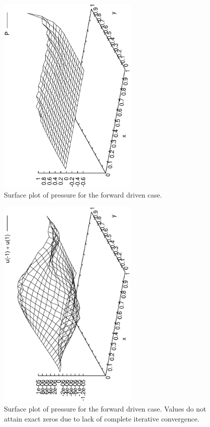 \documentclass[a4paper, 10pt]{article}
\begin{document}
\begin{enumerate}[I]
    \begin{figure}
      \centering
      \includegraphics[width=0.6\textwidth, angle = -90]{../plot/basic/pressure/P.eps}
      \caption{Surface plot of pressure for the forward driven case.}
      \label{splotP}
    \end{figure}
    
    \begin{figure}
      \centering
      \includegraphics[width=0.6\textwidth, angle = -90]{../plot/basic/velocity/UU.eps}
      \caption{Surface plot of pressure for the forward driven case. Values do not attain exact zeros due to lack of complete iterative convergence.}
      \label{splotU}
    \end{figure}


\end{enumerate}
\end{document}
